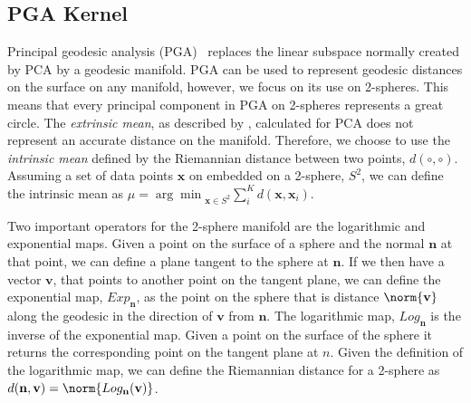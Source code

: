 \subsection{PGA Kernel}\label{subsec:pga-kernel}
Principal geodesic analysis (PGA)~\cite{fletcher2004principal,smith2008facial} replaces the
linear subspace normally created by PCA by a geodesic manifold. PGA can be used
to represent geodesic distances on the surface on any manifold, however, we
focus on its use on 2-spheres. This means that every principal component in PGA
on 2-spheres represents a great circle. The \textit{extrinsic mean}, as
described by \citet{pennec2006intrinsic}, calculated for PCA does not represent
an accurate distance on the manifold. Therefore, we choose to use the
\textit{intrinsic mean} defined by the Riemannian distance between two points,
$d(\circ,\circ)$. Assuming a set of data points $\mathbf{x}$ on embedded on
a 2-sphere, $S^2$, we can define the intrinsic mean as $\mu =
{\arg\min}_{\mathbf{x} \in S^2} \sum_i^K d(\mathbf{x},
\mathbf{x}_i)$.

Two important operators for the 2-sphere manifold are the logarithmic and
exponential maps. Given a point on the surface of a sphere and the normal
$\mathbf{n}$ at that point, we can define a plane tangent to the sphere at
$\mathbf{n}$. If we then have a vector $\mathbf{v}$, that points to
another point on the tangent plane, we can define the exponential map,
$Exp_{\mathbf{n}}$, as the point on the sphere that is distance
$\norm{\mathbf{v}}$ along the geodesic in the direction of $\mathbf{v}$
from $\mathbf{n}$. The logarithmic map, $Log_{\mathbf{n}}$ is the
inverse of the exponential map. Given a point on the surface of the sphere it
returns the corresponding point on the tangent plane at $n$. Given the
definition of the logarithmic map, we can define the Riemannian distance for a
2-sphere as $d(\mathbf{n}, \mathbf{v}) = \norm{Log_{\mathbf{n}}(\mathbf{v})}$.

